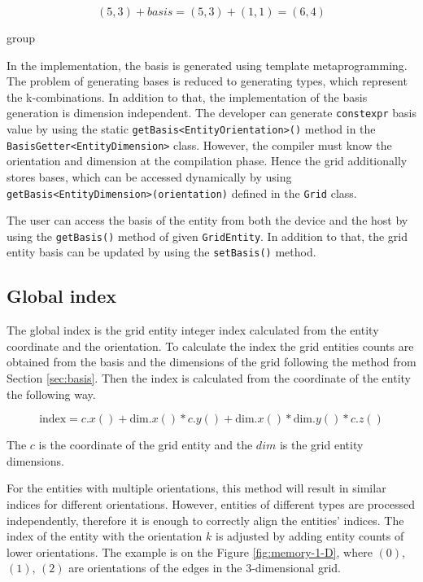 \begin{equation}
 (5, 3) + basis = (5, 3) + (1, 1) = (6, 4)
\end{equation}

\clearpage
{group}
\clearpage

In the implementation, the basis is generated using template metaprogramming.
The problem of generating bases is reduced to generating types, which represent the k-combinations.
In addition to that, the implementation of the basis generation is dimension independent.
The developer can generate \texttt{constexpr} basis value by using the static \texttt{getBasis<EntityOrientation>()} method in the \texttt{BasisGetter<EntityDimension>} class.
However, the compiler must know the orientation and dimension at the compilation phase.
Hence the grid additionally stores bases, which can be accessed dynamically by using \texttt{getBasis<EntityDimension>(orientation)} defined in the \texttt{Grid} class.

The user can access the basis of the entity from both the device and the host by using the \texttt{getBasis()} method of given \texttt{GridEntity}.
In addition to that, the grid entity basis can be updated by using the \texttt{setBasis()} method.

\subsection{Global index}

The global index is the grid entity integer index calculated from the entity coordinate and the orientation.
To calculate the index the grid entities counts are obtained from the basis and the dimensions of the grid following the method from Section \ref{sec:basis}.
Then the index is calculated from the coordinate of the entity the following way.

\begin{equation}
 \text{index} = c.x() + \text{dim}.x() * c.y() + \text{dim}.x() * \text{dim}.y() * c.z()
\end{equation}

The \(c\) is the coordinate of the grid entity and the \(dim\) is the grid entity dimensions.

For the entities with multiple orientations, this method will result in similar indices for different orientations.
However, entities of different types are processed independently, therefore it is enough to correctly align the entities' indices.
The index of the entity with the orientation \(k\) is adjusted by adding entity counts of lower orientations.
The example is on the Figure \ref{fig:memory-1-D}, where \((0)\), \((1)\), \((2)\) are orientations of the edges in the 3-dimensional grid.


